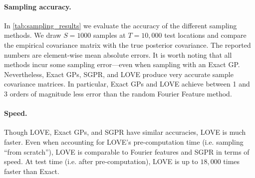 \paragraph{Sampling accuracy.}
In \cref{tab:sampling_results} we evaluate the accuracy of the different sampling methods.
We draw $S\!=\!1000$ samples at $T\!=\!10,\!000$ test locations and compare the empirical covariance matrix with the true posterior covariance.
The reported numbers are element-wise mean absolute errors.
It is worth noting that all methods incur some sampling error---even when sampling with an Exact GP.
Nevertheless, Exact GPs, SGPR, and LOVE{} produce very accurate sample covariance matrices.
In particular, Exact GPs and LOVE{} achieve between 1 and 3 orders of magnitude less error than the random Fourier Feature method.

\paragraph{Speed.}
Though LOVE{}, Exact GPs, and SGPR have similar accuracies, LOVE{} is much faster.
Even when accounting for LOVE's pre-computation time (i.e. sampling ``from scratch''), LOVE{} is comparable to Fourier features and SGPR in terms of speed.
At test time (i.e. after pre-computation), LOVE{} is up to $18,\!000$ times faster than Exact.


